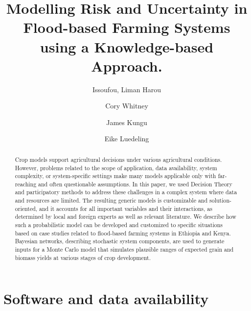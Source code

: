 \documentclass[]{elsarticle} %
\begin{document}
\begin{frontmatter}

  \title{Modelling Risk and Uncertainty in Flood-based Farming Systems using a Knowledge-based Approach.}
    \author[KU,ICRAF]{Issoufou, Liman Harou}
    \author[INRES]{Cory Whitney}
    \author[KU]{James Kungu}
    \author[INRES]{Eike Luedeling}
      \address[KU]{Kenyatta University, Department of Environmental Sciences, P.O. Box 43844 00100 Nairobi, Kenya}
    \address[ICRAF]{World Agroforestry Centre (ICRAF), United Nations Avenue, Gigiri, P.O. Box 30677-00100, Nairobi, Kenya}
    \address[INRES]{University of Bonn, Department of Horticultural Sciences, Auf dem Hügel 6, D-53121, Bonn, Germany}
    \address[ZEF]{Center for Development research (ZEF), University of Bonn, Genscherallee 3, D-53113, Bonn, Germany}
    
  \begin{abstract}
  Crop models support agricultural decisions under various agricultural conditions. However, problems related to the scope of application, data availability, system complexity, or system-specific settings make many models applicable only with far-reaching and often questionable assumptions. In this paper, we used Decision Theory and participatory methods to address these challenges in a complex system where data and resources are limited. The resulting generic models is customizable and solution-oriented, and it accounts for all important variables and their interactions, as determined by local and foreign experts as well as relevant literature. We describe how such a probabilistic model can be developed and customized to specific situations based on case studies related to flood-based farming systems in Ethiopia and Kenya. Bayesian networks, describing stochastic system components, are used to generate inputs for a Monte Carlo model that simulates plausible ranges of expected grain and biomass yields at various stages of crop development.
  \end{abstract}
  
 \end{frontmatter}

\hypertarget{software-and-data-availability}{%
\section*{Software and data availability}\label{software-and-data-availability}}
\end{document}
